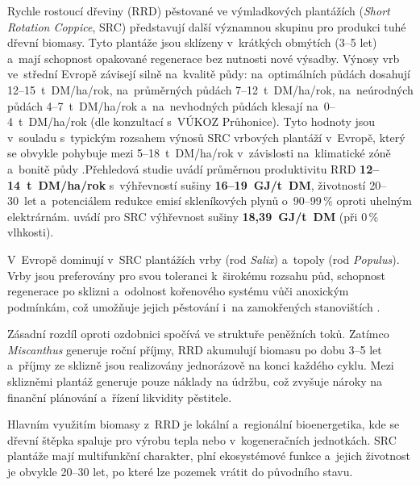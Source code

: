 Rychle rostoucí dřeviny (RRD) pěstované ve výmladkových plantážích
(\textit{Short Rotation Coppice}, SRC) představují další významnou
skupinu pro produkci tuhé dřevní biomasy. Tyto plantáže jsou sklízeny
v~krátkých obmýtích (3--5 let) a~mají schopnost opakované regenerace
bez nutnosti nové výsadby. Výnosy vrb ve~střední Evropě závisejí
silně na~kvalitě půdy: na~optimálních půdách dosahují
12--15~t~DM/ha/rok, na~průměrných půdách 7--12~t~DM/ha/rok,
na~neúrodných půdách 4--7~t~DM/ha/rok a~na~nevhodných půdách
klesají na~0--4~t~DM/ha/rok (dle konzultací s~VÚKOZ Průhonice). Tyto
hodnoty jsou v~souladu s~typickým rozsahem výnosů SRC vrbových plantáží
v~Evropě, který se obvykle pohybuje mezi 5--18~t~DM/ha/rok v~závislosti
na~klimatické zóně a~bonitě půdy \citep{dimitriou_2015}.Přehledová studie \citet{Rodrigues2021} uvádí průměrnou produktivitu
RRD \textbf{12--14~t~DM/ha/rok} s~výhřevností sušiny
\textbf{16--19~GJ/t~DM}, životností 20--30~let a~potenciálem redukce
emisí skleníkových plynů o~90--99\,\% oproti
uhelným elektrárnám. \citet{ThetaMetodika2024} uvádí pro SRC výhřevnost
sušiny \textbf{18{,}39~GJ/t~DM} (při 0\,\% vlhkosti).

V~Evropě dominují v~SRC plantážích vrby (rod \textit{Salix}) a~topoly 
(rod \textit{Populus}). Vrby jsou preferovány 
pro svou toleranci k~širokému rozsahu půd, schopnost regenerace po sklizni 
a~odolnost kořenového systému vůči anoxickým podmínkám, což umožňuje jejich 
pěstování i~na zamokřených stanovištích \citep{dimitriou_2015}.

Zásadní rozdíl oproti ozdobnici spočívá ve struktuře peněžních toků. Zatímco \textit{Miscanthus} generuje roční příjmy, RRD akumulují biomasu po dobu 3--5 let a~příjmy ze sklizně jsou realizovány jednorázově na konci každého cyklu. Mezi sklizněmi plantáž generuje pouze náklady na údržbu, což zvyšuje nároky na finanční plánování a~řízení likvidity pěstitele.



Hlavním využitím biomasy z~RRD je lokální a~regionální bioenergetika, kde se dřevní štěpka spaluje pro výrobu tepla nebo v~kogeneračních jednotkách. SRC plantáže mají multifunkční charakter, plní ekosystémové funkce a~jejich životnost je obvykle 20--30 let, po které lze pozemek vrátit do původního stavu.

